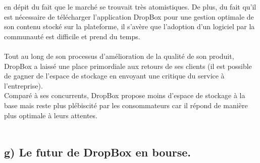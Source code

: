 \documentclass[a4paper, 10pt]{article}
\begin{document}
en dépit du fait que le marché se trouvait très atomistiques.
De plus, du fait qu'il est nécessaire de télécharger l'application DropBox pour une gestion optimale de son contenu stocké sur la plateforme,
il s'avère que l'adoption d'un logiciel par la communauté est difficile et prend du temps.\\ \\
Tout au long de son processus d'amélioration de la qualité de son produit, DropBox a laissé une place primordiale aux retours de ses clients
(il est possible de gagner de l'espace de stockage en envoyant une critique du service à l'entreprise).\\
Comparé à ses concurrents, DropBox propose moins d'espace de stockage à la base mais reste plus plébiscité par les consommateurs
car il répond de manière plus optimale à leurs attentes.\\ \\

\subsection*{g) Le futur de DropBox en bourse.}
\indent
\end{document}
